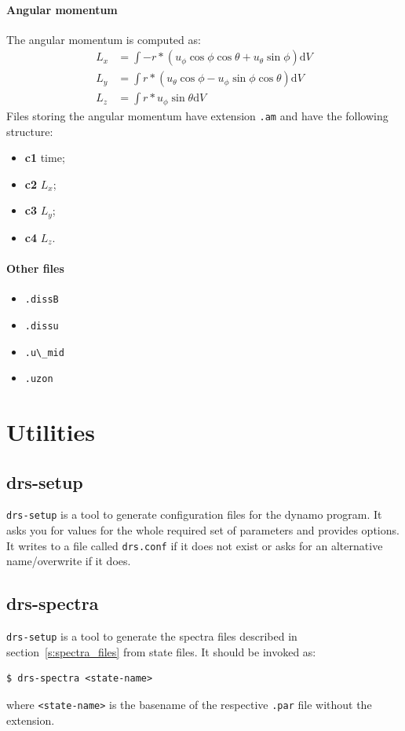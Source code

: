 \documentclass[a4paper,10pt]{book}
\begin{document}
\subsubsection{Angular momentum}
The angular momentum is computed as:
\begin{align}
 L_x &= \int -r*(u_\phi\cos\phi\cos\theta + u_\theta\sin\phi)\mbox{d}V \\
 L_y &= \int  r*(u_\theta\cos\phi - u_\phi\sin\phi\cos\theta)\mbox{d}V  \\
 L_z &= \int  r*u_\phi\sin\theta\mbox{d}V
\end{align}
Files storing the angular momentum have extension \verb|.am| and have the following
structure:
\begin{itemize}
 \item{\bf c1} time;
 \item{\bf c2} $L_x$;
 \item{\bf c3} $L_y$;
 \item{\bf c4} $L_z$.
\end{itemize}

\subsubsection{Other files}
\begin{itemize}
\item \verb|.dissB|
\item \verb|.dissu|
\item \verb|.u\_mid|
\item \verb|.uzon|
\end{itemize}

\appendix

\chapter{Utilities}
\section{drs-setup}
\label{util:drs-setup}
\verb|drs-setup| is a tool to generate configuration files for the dynamo
program. It asks you for values for the whole required set of parameters and
provides options. It writes to a file called \verb|drs.conf| if it does not
exist or asks for an alternative name/overwrite if it does.

\section{drs-spectra}
\label{util:drs-spectra}
\verb|drs-setup| is a tool to generate the spectra files described in
section~\ref{s:spectra_files} from state files. It should be invoked as:
\begin{verbatim}
$ drs-spectra <state-name>
\end{verbatim}
where \verb|<state-name>| is the basename of the respective \verb|.par| file
without the extension.
\end{document}
